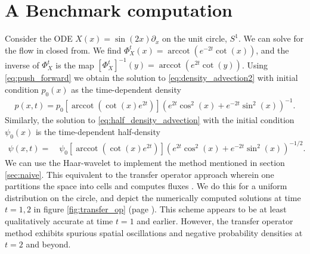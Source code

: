 \documentclass[letterpaper, 12 pt]{amsart}
\DeclareMathOperator{\arccot}{arccot}
\begin{document}
\section{A Benchmark computation}
Consider the ODE $X(x) = \sin(2x) \partial_x$ on the unit circle, $S^1$.
We can solve for the flow in closed from.  We find
$\Phi_X^t(x) = \arccot( e^{-2t} \cot(x) )$,
 and the inverse of $\Phi_X^t$ is the map $[\Phi_X^t]^{-1}(y) = \arccot( e^{2t} \cot(y) )$.
Using \eqref{eq:push_forward}
we obtain the solution to \eqref{eq:density_advection2} with initial condition $p_0(x)$ as the time-dependent density
\begin{align}
  p(x,t) = p_0\left[ \arccot \left( \cot(x)e^{2t} \right)\right]
  \left( e^{2t} \cos^2(x) + e^{-2t} \sin^2(x)  \right)^{-1}. \label{eq:benchmark}
\end{align}
Similarly, the solution to \eqref{eq:half_density_advection} with the initial condition $\psi_0(x)$ is the time-dependent half-density
\begin{align*}
  \psi(x,t) =  \quad \psi_0\left[\arccot\left( \cot(x)e^{2t} \right) \right]
  \left( e^{2t} \cos^2(x) + e^{-2t} \sin^2(x) \right)^{-1/2}. 
\end{align*}
We can use the Haar-wavelet to implement the method mentioned in section \ref{sec:naive}.
This equivalent to the transfer operator approach wherein one partitions the space into cells and computes fluxes \cite{FroylandJungeKoltai2013}.
We do this for a uniform distribution on the circle, and depict the numerically computed solutions at time $t=1,2$ in figure \ref{fig:transfer_op} (page \pageref{fig:transfer_op}).
This scheme appears to be at least qualitatively accurate at time $t=1$ and earlier.
However, the transfer operator method exhibits spurious spatial oscillations and negative probability densities at $t=2$ and beyond.
\end{document}
